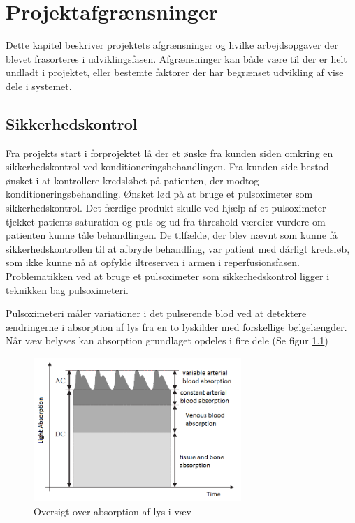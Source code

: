 \chapter{Projektafgrænsninger}
Dette kapitel beskriver projektets afgrænsninger og hvilke arbejdsopgaver der blevet frasorteres i udviklingsfasen. Afgrænsninger kan både være til der er helt undladt i projektet, eller bestemte faktorer der har begrænset udvikling af vise dele i systemet. 

\section{Sikkerhedskontrol}
Fra projekts start i forprojektet lå der et ønske fra kunden siden omkring en sikkerhedskontrol ved konditioneringsbehandlingen. Fra kunden side bestod ønsket i at kontrollere kredsløbet på patienten, der modtog konditioneringsbehandling. Ønsket lød på at bruge et pulsoximeter som sikkerhedskontrol. Det færdige produkt skulle ved hjælp af et pulsoximeter tjekket patients saturation og puls og ud fra threshold værdier vurdere om patienten kunne tåle behandlingen. De tilfælde, der blev nævnt som kunne få sikkerhedskontrollen til at afbryde behandling, var patient med dårligt kredsløb, som ikke kunne nå at opfylde iltreserven i armen i reperfusionsfasen. Problematikken ved at bruge et pulsoximeter som sikkerhedskontrol ligger i teknikken bag pulsoximeteri. 

Pulsoximeteri måler variationer i det pulserende blod ved at detektere ændringerne i absorption af lys fra en to lyskilder med forskellige bølgelængder. Når væv belyses kan absorption grundlaget opdeles i fire dele (Se figur \ref{fig:opticTissue})
\begin{figure}[H]
	\centering
	\includegraphics[width = 0.7\textwidth]{billeder/opticTissue.png}
	\caption{Oversigt over absorption af lys i væv}\label{fig:opticTissue}
\end{figure}

